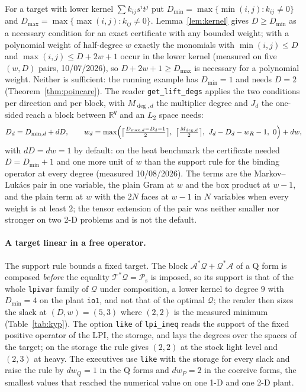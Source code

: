 \documentclass[12pt]{article}
\newcommand{\R}{\mathbb{R}}
\newcommand{\mcl}[1]{\mathcal{#1}}
\newcommand{\mrm}[1]{\mathrm{#1}}
\newcommand{\code}[1]{\texttt{#1}}
\theoremstyle{plain}
\theoremstyle{definition}
\theoremstyle{remark}
\begin{document}
For a target with lower kernel $\sum k_{ij}s^it^j$ put $D_{\min}=\max\{\min(i,j):k_{ij}\ne0\}$ and $D_{\max}=\max\{\max(i,j):k_{ij}\ne0\}$. Lemma~\ref{lem:kernel} gives $D\ge D_{\min}$ as a necessary condition for an exact certificate with any bounded weight; with a polynomial weight of half-degree $w$ exactly the monomials with $\min(i,j)\le D$ and $\max(i,j)\le D+2w+1$ occur in the lower kernel (measured on five $(w,D)$ pairs, 10/07/2026), so $D+2w+1\ge D_{\max}$ is necessary for a polynomial weight. Neither is sufficient: the running example has $D_{\min}=1$ and needs $D=2$ (Theorem~\ref{thm:poincare}). The reader \code{get\_lift\_degs} applies the two conditions per direction and per block, with $M_{\deg,d}$ the multiplier degree and $J_d$ the one-sided reach a block between $\R^q$ and an $L_2$ space needs:
\[
D_d=D_{\min,d}+dD,\qquad w_d=\max\Bigl(\bigl\lceil\tfrac{D_{\max,d}-D_d-1}{2}\bigr\rceil,\ \bigl\lceil\tfrac{M_{\deg,d}}{2}\bigr\rceil,\ J_d-D_d-w_R-1,\ 0\Bigr)+dw,
\]
with $dD=dw=1$ by default: on the heat benchmark the certificate needed $D=D_{\min}+1$ and one more unit of $w$ than the support rule for the binding operator at every degree (measured 10/08/2026). The terms are the Markov--Luk\'acs pair in one variable, the plain Gram at $w$ and the box product at $w-1$, and the plain term at $w$ with the $2N$ faces at $w-1$ in $N$ variables when every weight is at least $2$; the tensor extension of the pair was neither smaller nor stronger on two 2-D problems and is not the default.

\paragraph{A target linear in a free operator.} The support rule bounds a fixed target. The block $\mcl A^*\mcl Q+\mcl Q^*\mcl A$ of a Q form is composed \emph{before} the equality $\mcl T^*\mcl Q=\mcl P_{\mrm s}$ is imposed, so its support is that of the whole \code{lpivar} family of $\mcl Q$ under composition, a lower kernel to degree $9$ with $D_{\min}=4$ on the plant \code{io1}, and not that of the optimal $\mcl Q$; the reader then sizes the slack at $(D,w)=(5,3)$ where $(2,2)$ is the measured minimum (Table~\ref{tab:kyp}). The option \code{like} of \code{lpi\_ineq} reads the support of the fixed positive operator of the LPI, the storage, and lays the degrees over the spaces of the target; on the storage the rule gives $(2,2)$ at the stock light level and $(2,3)$ at heavy. The executives use \code{like} with the storage for every slack and raise the rule by $dw_Q=1$ in the Q forms and $dw_P=2$ in the coercive forms, the smallest values that reached the numerical value on one 1-D and one 2-D plant.
\end{document}
